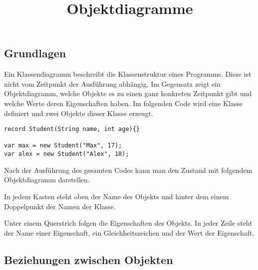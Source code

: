 \documentclass[a4paper]{scrartcl}
\date{}
\title{Objektdiagramme}
\begin{document}
\switchUmlcdSchool
\subsection*{Grundlagen}
Ein Klassendiagramm beschreibt die Klassenstruktur eines Programms. Diese ist nicht vom Zeitpunkt der Ausführung abhängig.
Im Gegensatz zeigt ein Objektdiagramm, welche Objekte es zu einen ganz konkreten Zeitpunkt gibt und welche Werte deren Eigenschaften haben. Im folgenden Code wird eine Klasse definiert und zwei Objekte dieser Klasse erzeugt.
\begin{verbatim}
record Student(String name, int age){}

var max = new Student("Max", 17);
var alex = new Student("Alex", 18);
\end{verbatim}
\noindent

Nach der Ausführung des gesamten Codes kann man den Zustand mit folgendem Objektdiagramm darstellen.

\begin{center}

In jedem Kasten steht oben der Name des Objekts und hinter dem einem Doppelpunkt der Namen der Klasse.

Unter einem Querstrich folgen die Eigenschaften des Objekts. In jeder Zeile steht der Name einer Eigenschaft, ein Gleichheitszeichen und der Wert der Eigenschaft.
\end{center}

\subsection*{Beziehungen zwischen Objekten}
\end{document}

